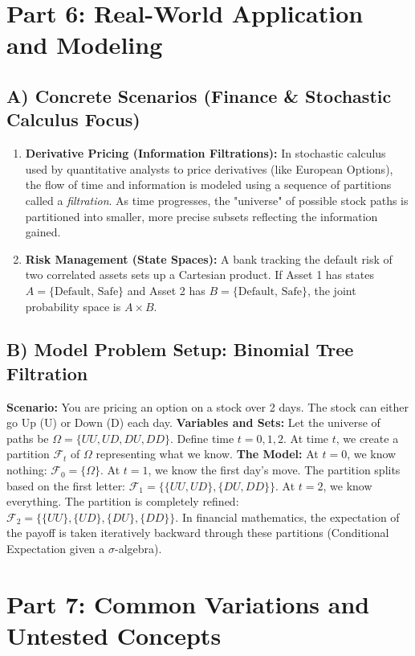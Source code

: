 \documentclass[12pt]{article}
\begin{document}
\newpage
\section{Part 6: Real-World Application and Modeling}

\subsection{A) Concrete Scenarios (Finance \& Stochastic Calculus Focus)}
\begin{enumerate}
    \item \textbf{Derivative Pricing (Information Filtrations):} In stochastic calculus used by quantitative analysts to price derivatives (like European Options), the flow of time and information is modeled using a sequence of partitions called a \textit{filtration}. As time progresses, the "universe" of possible stock paths is partitioned into smaller, more precise subsets reflecting the information gained.
    \item \textbf{Risk Management (State Spaces):} A bank tracking the default risk of two correlated assets sets up a Cartesian product. If Asset 1 has states $A = \{\text{Default, Safe}\}$ and Asset 2 has $B = \{\text{Default, Safe}\}$, the joint probability space is $A \times B$.
\end{enumerate}

\subsection{B) Model Problem Setup: Binomial Tree Filtration}
\textbf{Scenario:} You are pricing an option on a stock over 2 days. The stock can either go Up (U) or Down (D) each day.
\textbf{Variables and Sets:}
Let the universe of paths be $\Omega = \{UU, UD, DU, DD\}$.
Define time $t=0, 1, 2$. At time $t$, we create a partition $\mathcal{F}_t$ of $\Omega$ representing what we know.
\textbf{The Model:}
At $t=0$, we know nothing: $\mathcal{F}_0 = \{\Omega\}$.
At $t=1$, we know the first day's move. The partition splits based on the first letter:
$\mathcal{F}_1 = \{\{UU, UD\}, \{DU, DD\}\}$.
At $t=2$, we know everything. The partition is completely refined:
$\mathcal{F}_2 = \{\{UU\}, \{UD\}, \{DU\}, \{DD\}\}$.
In financial mathematics, the expectation of the payoff is taken iteratively backward through these partitions (Conditional Expectation given a $\sigma$-algebra).

\newpage
\section{Part 7: Common Variations and Untested Concepts}
\end{document}
